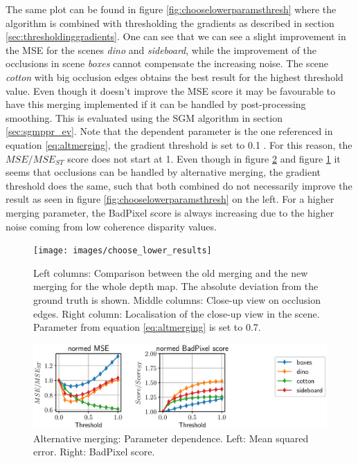 \documentclass  [
  paper    = a4,
  BCOR     = 10mm,
  twoside,
  fontsize = 12pt,
  fleqn,
  toc      = bibnumbered,
  toc      = listofnumbered,
  numbers  = noendperiod,
  headings = normal,
  listof   = leveldown,
  version  = 3.03
]                                       {scrreprt}
\begin{document}
The same plot can be found in figure \ref{fig:chooselowerparamsthresh} where the algorithm is combined with thresholding the gradients as described in section \ref{sec:thresholdinggradients}. One can see that we can see a slight improvement in the MSE for the scenes \textit{dino} and \textit{sideboard}, while the improvement of the occlusions in scene \textit{boxes} cannot compensate the increasing noise. The scene \textit{cotton} with big occlusion edges obtains the best result for the highest threshold value. Even though it doesn't improve the MSE score it may be favourable to have this merging implemented if it can be handled by post-processing smoothing. This is evaluated using the SGM algorithm in section \ref{sec:sgmppr_ev}. Note that the dependent parameter is the one referenced in equation \ref{eq:altmerging}, the gradient threshold is set to 0.1 . For this reason, the $MSE/MSE_{ST}$ score does not start at 1. Even though in figure \ref{fig:chooselowerparams} and figure \ref{fig:chooselowerresults} it seems that occlusions can be handled by alternative merging, the gradient threshold does the same, such that both combined do not necessarily improve the result as seen in figure \ref{fig:chooselowerparamsthresh} on the left. For a higher merging parameter, the BadPixel score is always increasing due to the higher noise coming from low coherence disparity values.
\begin{figure}[h!]
	\centering
	\texttt{[image: images/choose\_lower\_results]}
	\caption[Results from alternative merging of x- and y- direction]{Left columns: Comparison between the old merging and the new merging for the whole depth map. The absolute deviation from the ground truth is shown. Middle columns: Close-up view on occlusion edges. Right column: Localisation of the close-up view in the scene. Parameter from equation \ref{eq:altmerging} is set to 0.7.}
	\label{fig:chooselowerresults}
\end{figure}
\begin{figure}[h!]
	\centering
	\includegraphics[width=1\linewidth]{images/choose_lower_params}
	\caption[Alternative merging: Parameter dependence]{Alternative merging: Parameter dependence. Left: Mean squared error. Right: BadPixel score.}
	\label{fig:chooselowerparams}
\end{figure}
\end{document}
